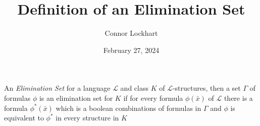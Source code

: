 \documentclass[a4paper]{article}
\title{Definition of an Elimination Set}
\date{February 27, 2024}
\author{Connor Lockhart}
\begin{document}
\maketitle
\par{An \emph{Elimination Set} for a language \(\mathcal {L}\) and class \(K\) of \(\mathcal {L}\)-structures, then a set \(\Gamma\) of formulas \(\phi\) is an elimination set for \(K\) if for every formula \(\phi ( \bar {x})\) of \(\mathcal {L}\) there is a formula \(\phi ^*( \bar {x})\) which is a boolean combinations of formulas in \(\Gamma\) and \(\phi\) is equivalent to \(\phi ^*\) in every structure in \(K\)}
\printbibliography
\end{document}
